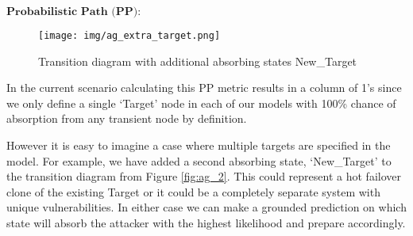 
\(
\textbf{Probabilistic Path (PP):} 
\)


\begin{figure}[H]
\centering
\texttt{[image: img/ag\_extra\_target.png]}
\caption{Transition diagram with additional absorbing states New\_Target}
\label{fig:ag_pp}
\end{figure}


In the current scenario calculating this PP metric results in a column of 1’s since we only define a single ‘Target’ node in each of our models with 100\% chance of absorption from any transient node by definition.   

However it is easy to imagine a case where multiple targets are specified in the model. For example, we have added a second absorbing state, ‘New\_Target’ to the transition diagram from Figure \ref{fig:ag_2}. This could represent a hot failover clone of the existing Target or it could be a completely separate system with unique vulnerabilities. In either case we can make a grounded prediction on which state will absorb the attacker with the highest likelihood and prepare accordingly. 

